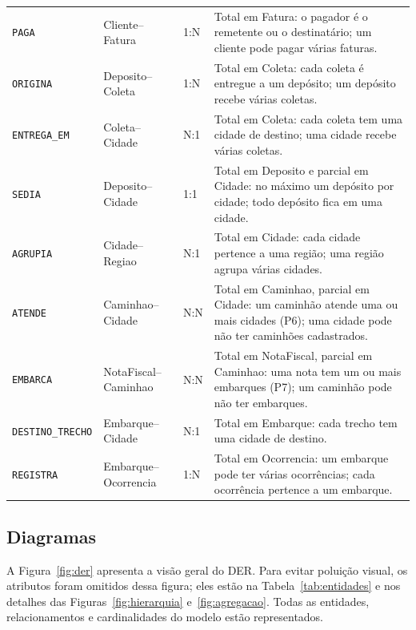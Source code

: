 {\begin{longtable}{@{}L{3.0cm}L{3.0cm}L{2.7cm}L{6.2cm}@{}}
\texttt{PAGA} & Cliente--Fatura & 1:N & Total em Fatura: o pagador é o remetente ou o destinatário; um cliente pode pagar várias faturas.\\

\texttt{ORIGINA} & Deposito--Coleta & 1:N & Total em Coleta: cada coleta é entregue a um depósito; um depósito recebe várias coletas.\\

\texttt{ENTREGA\_EM} & Coleta--Cidade & N:1 & Total em Coleta: cada coleta tem uma cidade de destino; uma cidade recebe várias coletas.\\

\texttt{SEDIA} & Deposito--Cidade & 1:1 & Total em Deposito e parcial em Cidade: no máximo um depósito por cidade; todo depósito fica em uma cidade.\\

\texttt{AGRUPIA} & Cidade--Regiao & N:1 & Total em Cidade: cada cidade pertence a uma região; uma região agrupa várias cidades.\\

\texttt{ATENDE} & Caminhao--Cidade & N:N & Total em Caminhao, parcial em Cidade: um caminhão atende uma ou mais cidades (P6); uma cidade pode não ter caminhões cadastrados.\\

\texttt{EMBARCA} & NotaFiscal--Caminhao & N:N & Total em NotaFiscal, parcial em Caminhao: uma nota tem um ou mais embarques (P7); um caminhão pode não ter embarques.\\

\texttt{DESTINO\_TRECHO} & Embarque--Cidade & N:1 & Total em Embarque: cada trecho tem uma cidade de destino.\\

\texttt{REGISTRA} & Embarque--Ocorrencia & 1:N & Total em Ocorrencia: um embarque pode ter várias ocorrências; cada ocorrência pertence a um embarque.\\
\end{longtable}
}

\subsection{Diagramas}

A Figura~\ref{fig:der} apresenta a visão geral do DER. Para evitar poluição visual, os atributos foram omitidos dessa figura; eles estão na Tabela~\ref{tab:entidades} e nos detalhes das Figuras~\ref{fig:hierarquia} e~\ref{fig:agregacao}. Todas as entidades, relacionamentos e cardinalidades do modelo estão representados.

